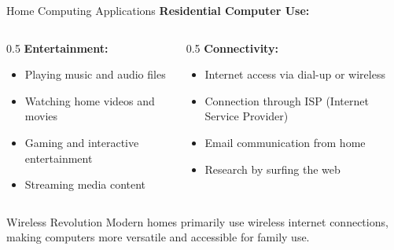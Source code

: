\documentclass[aspectratio=169]{beamer}
\begin{document}
\begin{frame}{Home Computing Applications}
    \textbf{Residential Computer Use:}
    
    \begin{columns}
        \begin{column}{0.5\textwidth}
            \textbf{Entertainment:}
            \begin{itemize}
                \item Playing music and audio files
                \item Watching home videos and movies
                \item Gaming and interactive entertainment
                \item Streaming media content
            \end{itemize}
            
            
        \end{column}
        \begin{column}{0.5\textwidth}
            \textbf{Connectivity:}
            \begin{itemize}
                \item Internet access via dial-up or wireless
                \item Connection through ISP (Internet Service Provider)
                \item Email communication from home
                \item Research by surfing the web
            \end{itemize}
        \end{column}
    \end{columns}
    
    \begin{exampleblock}{Wireless Revolution}
        Modern homes primarily use wireless internet connections, making computers more versatile and accessible for family use.
    \end{exampleblock}
\end{frame}
\end{document}
